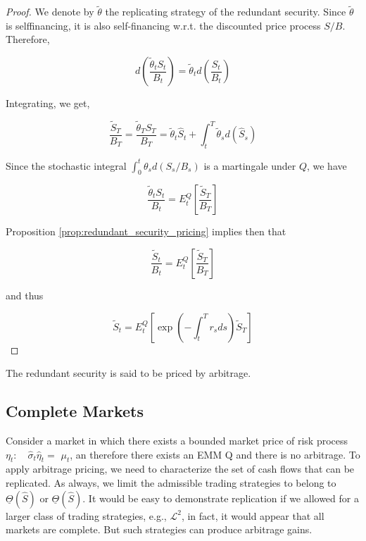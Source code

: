 \documentclass[\topdir/lecture\_notes.tex]{subfiles}
\begin{document}
\begin{proof}
We denote by $\tilde{\theta}$ the replicating strategy of the redundant security. Since $\tilde{\theta}$ is selffinancing, it is also self-financing w.r.t. the discounted price process $S / B$. Therefore,

\begin{equation*}
d\left(\frac{\tilde{\theta}_{t} S_{t}}{B_{t}}\right)=\tilde{\theta}_{t} d\left(\frac{S_{t}}{B_{t}}\right)
\end{equation*}

Integrating, we get,

\begin{equation*}
\frac{\tilde{S}_{T}}{B_{T}}=\frac{\tilde{\theta}_{T} S_{T}}{B_{T}}=\tilde{\theta}_{t} \hat{S}_{t}+\int_{t}^{T} \tilde{\theta}_{s} d\left(\hat{S}_{s}\right)
\end{equation*}

Since the stochastic integral $\int_{0}^{t} \theta_{s} d\left(S_{s} / B_{s}\right)$ is a martingale under $Q$, we have

\begin{equation*}
\frac{\tilde{\theta}_{t} S_{t}}{B_{t}}=E_{t}^{Q}\left[\frac{\tilde{S}_{T}}{B_{T}}\right]
\end{equation*}

Proposition \ref{prop:redundant_security_pricing} implies then that

\begin{equation*}
\frac{\tilde{S}_{t}}{B_{t}}=E_{t}^{Q}\left[\frac{\tilde{S}_{T}}{B_{T}}\right]
\end{equation*}

and thus

\begin{equation*}
\tilde{S}_{t}=E_{t}^{Q}\left[\exp \left(-\int_{t}^{T} r_{s} d s\right) \tilde{S}_{T}\right]
\end{equation*}

\end{proof}

The redundant security is said to be priced by arbitrage.

\subsection{Complete Markets}
Consider a market in which there exists a bounded market price of risk process $\eta_{t}: \quad \hat{\sigma}_{t} \hat{\eta}_{t}=$ $\mu_{t}$, an therefore there exists an EMM Q and there is no arbitrage. To apply arbitrage pricing, we need to characterize the set of cash flows that can be replicated. As always, we limit the admissible trading strategies to belong to $\underline{\Theta}(\hat{S})$ or $\underline{\Theta}(\hat{S})$. It would be easy to demonstrate replication if we allowed for a larger class of trading strategies, e.g., $\mathcal{L}^{2}$, in fact, it would appear that all markets are complete. But such strategies can produce arbitrage gains.
\end{document}
